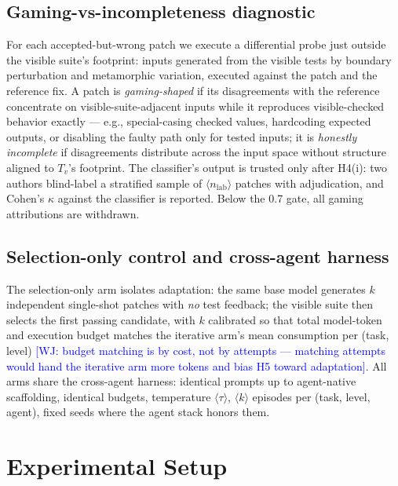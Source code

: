 \documentclass[conference]{IEEEtran}
\newcommand{\PH}[1]{\colorbox{gray!18}{\small$\langle$#1$\rangle$}}
\newcommand{\wj}[1]{\textcolor{blue}{\footnotesize [WJ: #1]}}
\begin{document}
\subsection{Gaming-vs-incompleteness diagnostic}\label{sec:diagnostic}
For each accepted-but-wrong patch we execute a differential probe just
outside the visible suite's footprint: inputs generated from the visible
tests by boundary perturbation and metamorphic variation, executed
against the patch and the reference fix. A patch is \emph{gaming-shaped}
if its disagreements with the reference concentrate on
visible-suite-adjacent inputs while it reproduces visible-checked
behavior exactly --- e.g., special-casing checked values, hardcoding
expected outputs, or disabling the faulty path only for tested inputs;
it is \emph{honestly incomplete} if disagreements distribute across the
input space without structure aligned to $T_v$'s footprint. The
classifier's output is trusted only after H4(i): two authors blind-label
a stratified sample of \PH{$n_{\mathrm{lab}}$} patches with adjudication,
and Cohen's $\kappa$ against the classifier is reported. Below the 0.7
gate, all gaming attributions are withdrawn.

\subsection{Selection-only control and cross-agent harness}\label{sec:controls}
The selection-only arm isolates adaptation: the same base model generates
$k$ independent single-shot patches with \emph{no} test feedback; the
visible suite then selects the first passing candidate, with $k$
calibrated so that total model-token and execution budget matches the
iterative arm's mean consumption per (task, level)
\wj{budget matching is by cost, not by attempts --- matching attempts
would hand the iterative arm more tokens and bias H5 toward
adaptation}. All arms share the cross-agent harness: identical prompts
up to agent-native scaffolding, identical budgets, temperature
\PH{$\tau$}, \PH{$k$} episodes per (task, level, agent), fixed seeds
where the agent stack honors them.

\section{Experimental Setup}\label{sec:setup}
\end{document}
